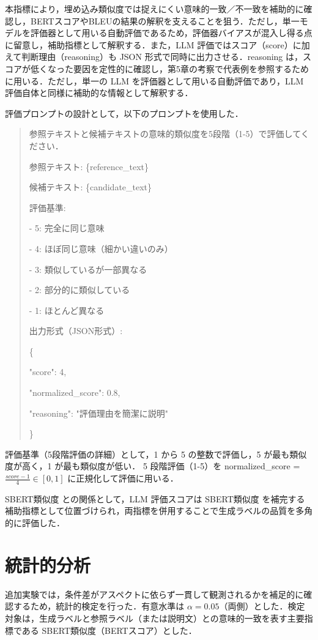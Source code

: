 本指標により，埋め込み類似度では捉えにくい意味的一致／不一致を補助的に確認し，BERTスコアやBLEUの結果の解釈を支えることを狙う．ただし，単一モデルを評価器として用いる自動評価であるため，評価器バイアスが混入し得る点に留意し，補助指標として解釈する．また，LLM 評価ではスコア（score）に加えて判断理由（reasoning）も JSON 形式で同時に出力させる．reasoning は，スコアが低くなった要因を定性的に確認し，第5章の考察で代表例を参照するために用いる．ただし，単一の LLM を評価器として用いる自動評価であり，LLM 評価自体と同様に補助的な情報として解釈する．

評価プロンプトの設計として，以下のプロンプトを使用した．
\begin{quote}
\ttfamily
参照テキストと候補テキストの意味的類似度を5段階（1-5）で評価してください．\par
参照テキスト: \{reference\_text\}\par
候補テキスト: \{candidate\_text\}\par
評価基準:\par
- 5: 完全に同じ意味\par
- 4: ほぼ同じ意味（細かい違いのみ）\par
- 3: 類似しているが一部異なる\par
- 2: 部分的に類似している\par
- 1: ほとんど異なる\par
出力形式（JSON形式）:\par
\{\par
    "score": 4,\par
    "normalized\_score": 0.8,\par
    "reasoning": "評価理由を簡潔に説明"\par
\}\par
\end{quote}

評価基準（5段階評価の詳細）として，1 から 5 の整数で評価し，5 が最も類似度が高く，1 が最も類似度が低い．
5 段階評価（1-5）を normalized\_score = $\frac{score - 1}{4} \in [0, 1]$ に正規化して評価に用いる．

SBERT類似度 との関係として，LLM 評価スコアは SBERT類似度 を補完する補助指標として位置づけられ，両指標を併用することで生成ラベルの品質を多角的に評価した．

\section{統計的分析}
\label{sec:statistical_tests}
追加実験では，条件差がアスペクトに依らず一貫して観測されるかを補足的に確認するため，統計的検定を行った．有意水準は \( \alpha=0.05 \)（両側）とした．検定対象は，生成ラベルと参照ラベル（または説明文）との意味的一致を表す主要指標である SBERT類似度（BERTスコア）とした．

